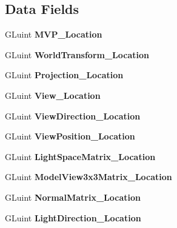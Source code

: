 \subsection*{Data Fields}
\begin{DoxyCompactItemize}
\item 
G\+Luint {\bfseries M\+V\+P\+\_\+\+Location}\hypertarget{class_shader_a68fc3359cca582d93004934f7e37975b}{}\label{class_shader_a68fc3359cca582d93004934f7e37975b}

\item 
G\+Luint {\bfseries World\+Transform\+\_\+\+Location}\hypertarget{class_shader_a617fdd437bbddbb5f6dc73bb3707022f}{}\label{class_shader_a617fdd437bbddbb5f6dc73bb3707022f}

\item 
G\+Luint {\bfseries Projection\+\_\+\+Location}\hypertarget{class_shader_ad6b5b0c6b02b43f762029389c8dacc0f}{}\label{class_shader_ad6b5b0c6b02b43f762029389c8dacc0f}

\item 
G\+Luint {\bfseries View\+\_\+\+Location}\hypertarget{class_shader_aa2568a521e2de216461bcacc7eead23b}{}\label{class_shader_aa2568a521e2de216461bcacc7eead23b}

\item 
G\+Luint {\bfseries View\+Direction\+\_\+\+Location}\hypertarget{class_shader_af6fd3359c77b8975585c9aa9e8b0d410}{}\label{class_shader_af6fd3359c77b8975585c9aa9e8b0d410}

\item 
G\+Luint {\bfseries View\+Position\+\_\+\+Location}\hypertarget{class_shader_ac6b23adb20bdd0451b32d1f7f31cd2f8}{}\label{class_shader_ac6b23adb20bdd0451b32d1f7f31cd2f8}

\item 
G\+Luint {\bfseries Light\+Space\+Matrix\+\_\+\+Location}\hypertarget{class_shader_acdca24ceeda39a86bbdd00ffb4f6c162}{}\label{class_shader_acdca24ceeda39a86bbdd00ffb4f6c162}

\item 
G\+Luint {\bfseries Model\+View3x3\+Matrix\+\_\+\+Location}\hypertarget{class_shader_a9fe709fa0eb7c08f85af5a17fc36cbc2}{}\label{class_shader_a9fe709fa0eb7c08f85af5a17fc36cbc2}

\item 
G\+Luint {\bfseries Normal\+Matrix\+\_\+\+Location}\hypertarget{class_shader_acce6b6ee730d22e50890019791218f7a}{}\label{class_shader_acce6b6ee730d22e50890019791218f7a}

\item 
G\+Luint {\bfseries Light\+Direction\+\_\+\+Location}\hypertarget{class_shader_af31699cd06ed279684c4d7d97ef977a0}{}\label{class_shader_af31699cd06ed279684c4d7d97ef977a0}


\end{DoxyCompactItemize}
